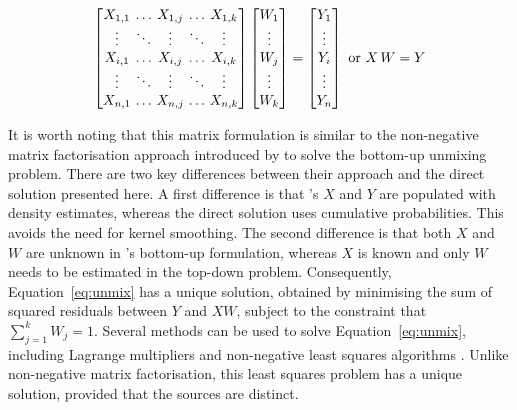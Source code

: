 \documentclass{article}
\begin{document}
\begin{equation}
  \left[
  \begin{array}{@{}c@{~}c@{~}c@{~}c@{~}c@{}}
    X_{1,1} & \ldots & X_{1,j} & \ldots & X_{1,k} \\
    \vdots & \ddots & \vdots & \ddots & \vdots \\
    X_{i,1} & \ldots & X_{i,j} & \ldots & X_{i,k} \\
    \vdots & \ddots & \vdots & \ddots & \vdots \\
    X_{n,1} & \ldots & X_{n,j} & \ldots & X_{n,k} \\
  \end{array}
  \right]
  \left[
    \begin{array}{@{}c@{}}
      W_{1} \\
      \vdots \\
      W_{j} \\
      \vdots \\
      W_{k}
    \end{array}
    \right]
  =
  \left[
  \begin{array}{@{}c@{}}
    Y_{1} \\
    \vdots \\
    Y_{i} \\
    \vdots \\
    Y_{n}
  \end{array}
  \right]
  \mbox{~or~}
  X\,W = Y
    \label{eq:unmix}
\end{equation}

It is worth noting that this matrix formulation is similar to the
non-negative matrix factorisation approach introduced by
\citet{saylor2019} to solve the bottom-up unmixing problem. There are
two key differences between their approach and the direct solution
presented here.  A first difference is that \citet{saylor2019}'s $X$
and $Y$ are populated with density estimates, whereas the direct
solution uses cumulative probabilities. This avoids the need for
kernel smoothing. The second difference is that both $X$ and $W$ are
unknown in \citet{saylor2019}'s bottom-up formulation, whereas $X$ is
known and only $W$ needs to be estimated in the top-down
problem. Consequently, Equation~\ref{eq:unmix} has a unique solution,
obtained by minimising the sum of squared residuals between $Y$ and
$XW$, subject to the constraint that $\sum_{j=1}^k W_j=1$. Several
methods can be used to solve Equation~\ref{eq:unmix}, including
Lagrange multipliers and non-negative least squares algorithms
\citep{lawson1995}. Unlike non-negative matrix factorisation, this
least squares problem has a unique solution, provided that the sources
are distinct.\medskip
\end{document}
